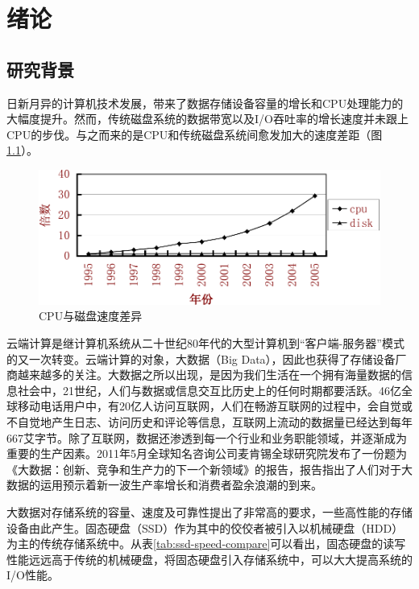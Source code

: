 
\chapter{绪论}
\label{cha:introduction}

\section{研究背景}
\label{sec:background}

日新月异的计算机技术发展，带来了数据存储设备容量的增长和CPU处理能力的大幅度提升。然而，传统磁盘系统的数据带宽以及I/O吞吐率的增长速度并未跟上CPU的步伐。与之而来的是CPU和传统磁盘系统间愈发加大的速度差距\cite{matthews2008intelturbomem}（图\ref{fig:cpu-disk-diff}）。

\begin{figure}[H]
\centering
\includegraphics[width=0.7\linewidth]{./graph/cpu-disk-gap}
\caption{CPU与磁盘速度差异}
\label{fig:cpu-disk-diff}
\end{figure}

云端计算\cite{jimgray2003cloud}是继计算机系统从二十世纪80年代的大型计算机到“客户端-服务器”模式的又一次转变。云端计算的对象，大数据（Big Data），因此也获得了存储设备厂商越来越多的关注。大数据之所以出现，是因为我们生活在一个拥有海量数据的信息社会中，21世纪，人们与数据或信息交互比历史上的任何时期都要活跃。46亿全球移动电话用户中，有20亿人访问互联网，人们在畅游互联网的过程中，会自觉或不自觉地产生日志、访问历史和评论等信息，互联网上流动的数据量已经达到每年667艾字节。除了互联网，数据还渗透到每一个行业和业务职能领域，并逐渐成为重要的生产因素。2011年5月全球知名咨询公司麦肯锡全球研究院发布了一份题为《大数据：创新、竞争和生产力的下一个新领域》的报告，报告指出了人们对于大数据的运用预示着新一波生产率增长和消费者盈余浪潮的到来。

大数据对存储系统的容量、速度及可靠性提出了非常高的要求，一些高性能的存储设备由此产生。固态硬盘（SSD）作为其中的佼佼者被引入以机械硬盘（HDD）为主的传统存储系统中\cite{morris2003evostorage}。从表\ref{tab:ssd-speed-compare}可以看出，固态硬盘的读写性能远远高于传统的机械硬盘\cite{libo2010cacheforssd}，将固态硬盘引入存储系统中，可以大大提高系统的I/O性能。

